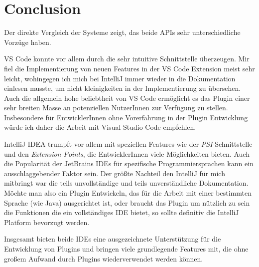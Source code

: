 \chapter{Conclusion}
\label{cha:Conclusion}

Der direkte Vergleich der Systeme zeigt,
das beide APIs sehr unterschiedliche Vorzüge haben.

VS Code konnte vor allem durch die sehr intuitive
Schnittstelle überzeugen. Mir fiel die Implementierung
von neuen Features in der VS Code Extension meist sehr
leicht, wohingegen ich mich bei IntelliJ immer wieder
in die Dokumentation einlesen musste, um nicht
kleinigkeiten in der Implementierung zu übersehen.
Auch die allgemein hohe beliebtheit von VS Code
ermöglicht es das Plugin einer sehr breiten Masse 
an potenziellen NutzerInnen zur Verfügung zu stellen.
Insbesondere für EntwicklerInnen ohne Vorerfahrung
in der Plugin Entwicklung würde ich daher die Arbeit mit
Visual Studio Code empfehlen.

IntelliJ IDEA trumpft vor allem mit speziellen Features
wie der \emph{PSI}-Schnittstelle und den \emph{Extension Points},
die EntwicklerInnen viele Möglichkeiten bieten.
Auch die Popularität der JetBrains IDEs für spezifische 
Programmiersprachen kann ein ausschlaggebender Faktor
sein. Der größte Nachteil den IntelliJ für mich mitbringt
war die teils unvollständige und teils unverständliche
Dokumentation. Möchte man also ein Plugin Entwickeln, das 
für die Arbeit mit einer bestimmten Sprache (wie Java)
ausgerichtet ist, oder braucht das Plugin um nützlich zu
sein die Funktionen die ein vollständiges IDE bietet, so
sollte definitiv die IntelliJ Platform bevorzugt werden.

Insgesamt bieten beide IDEs eine ausgezeichnete 
Unterstützung für die Entwicklung von Plugins und
bringen viele grundlegende Features mit, die
ohne großem Aufwand durch Plugins wiederverwendet
werden können.